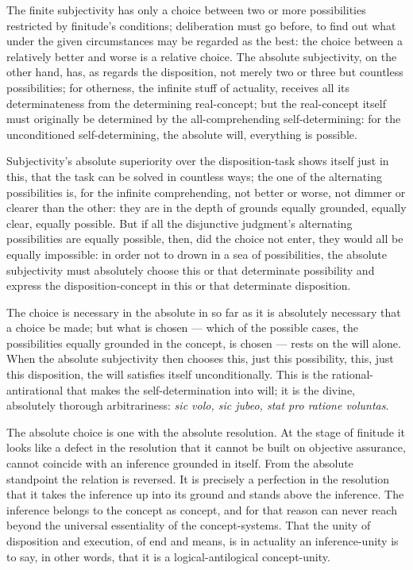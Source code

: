 \documentclass[12pt]{book}
\begin{document}
The finite subjectivity has only a choice between two or more
possibilities restricted by finitude's conditions; deliberation must
go before, to find out what under the given circumstances may be
regarded as the best: the choice between a relatively better and
worse is a relative choice. The absolute subjectivity, on the other
hand, has, as regards the disposition, not merely two or three but
countless possibilities; for otherness, the infinite stuff of
actuality, receives
all its determinateness from the determining real-concept; but the
real-concept itself must originally be determined by the
all-comprehending self-determining: for the unconditioned
self-determining, the absolute will, everything is possible.

Subjectivity's absolute superiority over the disposition-task shows
itself just in this, that the task can be solved in countless ways;
the one of the alternating possibilities is, for the infinite
comprehending, not better or worse, not dimmer or clearer than the
other: they are in the depth of grounds equally grounded, equally
clear, equally possible. But if all the disjunctive judgment's
alternating possibilities are equally possible, then, did the choice
not enter, they would all be equally impossible: in order not to
drown in a sea of possibilities, the absolute subjectivity must
absolutely choose this or that determinate possibility and express
the disposition-concept in this or that determinate disposition.

The choice is necessary in the absolute in so far as it is
absolutely necessary that a choice be made; but what is chosen ---
which of the possible cases, the possibilities equally grounded in
the concept, is chosen --- rests on the will alone. When the
absolute subjectivity then chooses this, just this possibility,
this, just this disposition, the will satisfies itself
unconditionally. This is the rational-antirational that makes the
self-determination into will; it is the divine, absolutely thorough
arbitrariness: \textit{sic volo, sic jubeo, stat pro ratione
voluntas}.

The absolute choice is one with the absolute resolution. At the
stage of finitude it looks like a defect in the resolution that it
cannot be built on objective assurance, cannot coincide with an
inference grounded in itself. From the absolute standpoint the
relation is reversed. It is precisely a perfection in the resolution
that it takes the inference up into its ground and stands above the
inference. The inference belongs to the concept as concept, and for
that
reason can never reach beyond the universal essentiality of the
concept-systems. That the unity of disposition and execution, of end
and means, is in actuality an inference-unity is to say, in other
words, that it is a logical-antilogical concept-unity.
\end{document}
